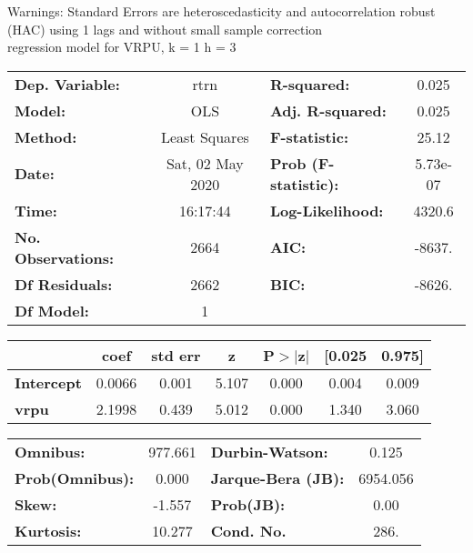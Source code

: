 Warnings: \newline
 [1] Standard Errors are heteroscedasticity and autocorrelation robust (HAC) using 1 lags and without small sample correction\\ 

regression model for VRPU, k = 1 h = 3\begin{center}
\begin{tabular}{lclc}
\toprule
\textbf{Dep. Variable:}    &       rtrn       & \textbf{  R-squared:         } &     0.025   \\
\textbf{Model:}            &       OLS        & \textbf{  Adj. R-squared:    } &     0.025   \\
\textbf{Method:}           &  Least Squares   & \textbf{  F-statistic:       } &     25.12   \\
\textbf{Date:}             & Sat, 02 May 2020 & \textbf{  Prob (F-statistic):} &  5.73e-07   \\
\textbf{Time:}             &     16:17:44     & \textbf{  Log-Likelihood:    } &    4320.6   \\
\textbf{No. Observations:} &        2664      & \textbf{  AIC:               } &    -8637.   \\
\textbf{Df Residuals:}     &        2662      & \textbf{  BIC:               } &    -8626.   \\
\textbf{Df Model:}         &           1      & \textbf{                     } &             \\
\bottomrule
\end{tabular}
\begin{tabular}{lcccccc}
                   & \textbf{coef} & \textbf{std err} & \textbf{z} & \textbf{P$> |$z$|$} & \textbf{[0.025} & \textbf{0.975]}  \\
\midrule
\textbf{Intercept} &       0.0066  &        0.001     &     5.107  &         0.000        &        0.004    &        0.009     \\
\textbf{vrpu}      &       2.1998  &        0.439     &     5.012  &         0.000        &        1.340    &        3.060     \\
\bottomrule
\end{tabular}
\begin{tabular}{lclc}
\textbf{Omnibus:}       & 977.661 & \textbf{  Durbin-Watson:     } &    0.125  \\
\textbf{Prob(Omnibus):} &   0.000 & \textbf{  Jarque-Bera (JB):  } & 6954.056  \\
\textbf{Skew:}          &  -1.557 & \textbf{  Prob(JB):          } &     0.00  \\
\textbf{Kurtosis:}      &  10.277 & \textbf{  Cond. No.          } &     286.  \\
\bottomrule
\end{tabular}
\end{center}

